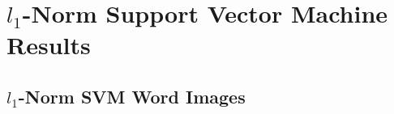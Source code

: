 \documentclass[11pt]{article}
\newcommand{\1}[1]{{\mathbf 1}\left\{#1\right\}}        %
\begin{document}
\newpage
\section{$l_1$-Norm Support Vector Machine Results}


\subsection{$l_1$-Norm SVM Word Images}\label{asec:svmwordimages}








\end{document}
